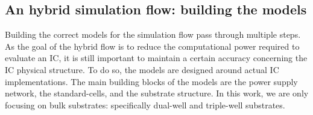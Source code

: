 \subsection{An hybrid simulation flow: building the models}
	Building the correct models for the simulation flow pass through multiple steps.
	As the goal of the hybrid flow is to reduce the computational power required to evaluate an IC, it is still important to maintain a certain accuracy concerning the IC physical structure.
	To do so, the models are designed around actual IC implementations.
	The main building blocks of the models are the power supply network, the standard-cells, and the substrate structure.
	In this work, we are only focusing on bulk substrates: specifically dual-well and triple-well substrates.
